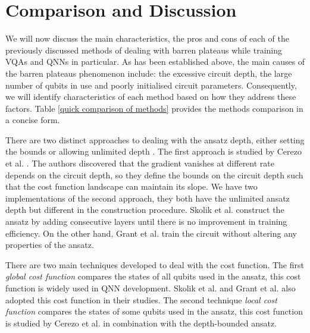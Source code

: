 \section{Comparison and Discussion}
We will now discuss the main characteristics, the pros and cons of each of the previously discussed methods of dealing with barren plateaus while training VQAs and QNNs in particular.
As has been established above, the main causes of the barren plateaus phenomenon include: the excessive circuit depth, the large number of qubits in use and poorly initialised circuit parameters.
Consequently, we will identify characteristics of each method based on how they address these factors.
Table \ref{quick comparison of methods} provides the methods comparison in a concise form.

There are two distinct approaches to dealing with the ansatz depth, either setting the bounds \cite{cerezoCostFunctionDependent2021} or allowing unlimited depth \cite{skolikLayerwiseLearningQuantum2021, grantInitializationStrategyAddressing2019}.
The first approach is studied by Cerezo et al. \cite{cerezoCostFunctionDependent2021}.
The authors discovered that the gradient vanishes at different rate depends on the circuit depth, so they define the bounds on the circuit depth such that the cost function landscape can maintain its slope.
We have two implementations of the second approach, they both have the unlimited ansatz depth but different in the construction procedure.
Skolik et al. \cite{skolikLayerwiseLearningQuantum2021} construct the ansatz by adding consecutive layers until there is no improvement in training efficiency.
On the other hand, Grant et al. \cite{grantInitializationStrategyAddressing2019} train the circuit without altering any properties of the ansatz.

There are two main techniques developed to deal with the cost function.
The first \emph{global cost function} compares the states of all qubits used in the ansatz, this cost function is widely used in QNN development.
Skolik et al. and Grant et al. also adopted this cost function in their studies.
The second technique \emph{local cost function} compares the states of some qubits used in the ansatz, this cost function is studied by Cerezo et al. \cite{cerezoCostFunctionDependent2021} in combination with the depth-bounded ansatz.

